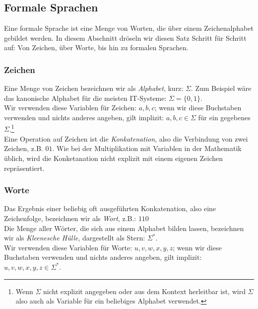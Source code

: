 \subsection{Formale Sprachen}\label{subsec:formaleSprachen}

Eine formale Sprache ist eine Menge von Worten,
die über einem Zeichenalphabet gebildet werden.
In diesem Abschnitt dröseln wir diesen Satz Schritt für Schritt auf:
Von Zeichen, über Worte, bis hin zu formalen Sprachen.

\subsubsection{Zeichen}

Eine Menge von Zeichen bezeichnen wir als \emph{Alphabet}, kurz: $\Sigma$.
Zum Beispiel wäre das kanonische Alphabet für die meisten IT-Systeme: $\Sigma = \{0,1\}$.\\

\noindent
Wir verwenden diese Variablen für Zeichen: $a,b,c$;
wenn wir diese Buchstaben verwenden und nichts anderes angeben,
gilt implizit: $a, b, c \in \Sigma$ für ein gegebenes $\Sigma$.\footnote{
Wenn $\Sigma$ nicht explizit angegeben oder aus dem Kontext herleitbar ist,
wird $\Sigma$ also auch als Variable für ein beliebiges Alphabet verwendet.}\\

\noindent
Eine Operation auf Zeichen ist die \emph{Konkatenation},
also die Verbindung von zwei Zeichen, z.B. $01$.
Wie bei der Multiplikation mit Variablen in der Mathematik üblich,
wird die Konketanation nicht explizit mit einem eigenen Zeichen repräsentiert.

\subsubsection{Worte}
Das Ergebnis einer beliebig oft ausgeführten Konkatenation,
also eine Zeichenfolge,
bezeichnen wir als \emph{Wort}, z.B.: $110$\\

\noindent
Die Menge aller Wörter,
die sich aus einem Alphabet bilden lassen,
bezeichnen wir als \emph{Kleenesche Hülle}, dargestellt als Stern: $\Sigma^*$.\\

\noindent
Wir verwenden diese Variablen für Worte:
$u, v, w, x, y, z$; wenn wir diese Buchstaben verwenden und nichts anderes angeben,
gilt implizit: $u, v, w, x, y, z \in \Sigma^*$.\\

